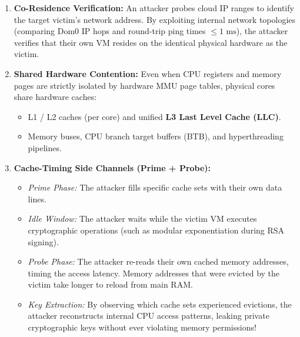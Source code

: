 \documentclass[11pt,a4paper,openany]{report}
\begin{document}
\begin{enumerate}[leftmargin=*]
  \item \textbf{Co-Residence Verification:} An attacker probes cloud IP ranges to identify the target victim's network address. By exploiting internal network topologies (comparing Dom0 IP hops and round-trip ping times $\le 1\text{ ms}$), the attacker verifies that their own VM resides on the identical physical hardware as the victim.
  \item \textbf{Shared Hardware Contention:} Even when CPU registers and memory pages are strictly isolated by hardware MMU page tables, physical cores share hardware caches:
    \begin{itemize}
      \item L1 / L2 caches (per core) and unified \textbf{L3 Last Level Cache (LLC)}.
      \item Memory buses, CPU branch target buffers (BTB), and hyperthreading pipelines.
    \end{itemize}
  \item \textbf{Cache-Timing Side Channels (Prime + Probe):}
    \begin{itemize}
      \item \emph{Prime Phase:} The attacker fills specific cache sets with their own data lines.
      \item \emph{Idle Window:} The attacker waits while the victim VM executes cryptographic operations (such as modular exponentiation during RSA signing).
      \item \emph{Probe Phase:} The attacker re-reads their own cached memory addresses, timing the access latency. Memory addresses that were evicted by the victim take longer to reload from main RAM.
      \item \emph{Key Extraction:} By observing which cache sets experienced evictions, the attacker reconstructs internal CPU access patterns, leaking private cryptographic keys without ever violating memory permissions!
    \end{itemize}
\end{enumerate}
\end{document}
